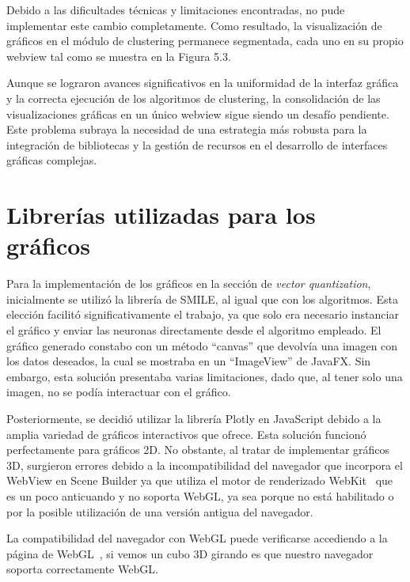 Debido a las dificultades técnicas y limitaciones encontradas, no pude implementar este cambio completamente. Como resultado, la visualización de gráficos en el módulo de clustering permanece segmentada, cada uno en su propio webview tal como se muestra en la Figura 5.3.


Aunque se lograron avances significativos en la uniformidad de la interfaz gráfica y la correcta ejecución de los algoritmos de clustering, la consolidación de las visualizaciones gráficas en un único webview sigue siendo un desafío pendiente. Este problema subraya la necesidad de una estrategia más robusta para la integración de bibliotecas y la gestión de recursos en el desarrollo de interfaces gráficas complejas.

\section{Librerías utilizadas para los gráficos}

Para la implementación de los gráficos en la sección de \emph{vector quantization}, inicialmente se utilizó la librería de SMILE, al igual que con los algoritmos. Esta elección facilitó significativamente el trabajo, ya que solo era necesario instanciar el gráfico y enviar las neuronas directamente desde el algoritmo empleado. El gráfico generado constabo con un método ``canvas'' que devolvía una imagen con los datos deseados, la cual se mostraba en un ``ImageView'' de JavaFX. Sin embargo, esta solución presentaba varias limitaciones, dado que, al tener solo una imagen, no se podía interactuar con el gráfico.

Posteriormente, se decidió utilizar la librería Plotly en JavaScript debido a la amplia variedad de gráficos interactivos que ofrece. Esta solución funcionó perfectamente para gráficos 2D. No obstante, al tratar de implementar gráficos 3D, surgieron errores debido a la incompatibilidad del navegador que incorpora el WebView en Scene Builder ya que utiliza el motor de renderizado WebKit~\cite{webkit} que es un poco anticuando y no soporta WebGL, ya sea porque no está habilitado o por la posible utilización de una versión antigua del navegador.

La compatibilidad del navegador con WebGL puede verificarse accediendo a la página de WebGL~\cite{webgl:test}, si vemos un cubo 3D girando es que nuestro navegador soporta correctamente WebGL.

